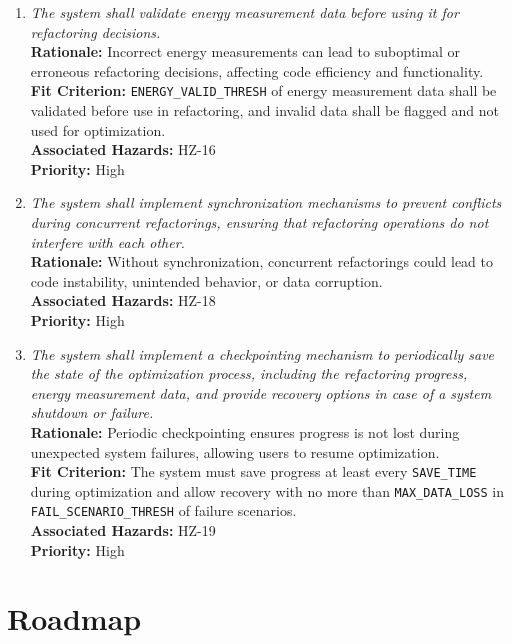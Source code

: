\documentclass{article}
\begin{document}
\begin{enumerate}[label=SCR \arabic*., wide=0pt, leftmargin=*]
    \item \emph{The system shall validate energy measurement data before using it for refactoring decisions.}\\
    {\bf Rationale:} Incorrect energy measurements can lead to suboptimal or erroneous refactoring decisions, affecting code efficiency and functionality.\\
    {\bf Fit Criterion:} \texttt{ENERGY\_VALID\_THRESH} of energy measurement data shall be validated before use in refactoring, and invalid data shall be flagged and not used for optimization.\\
    {\bf Associated Hazards:} HZ-16\\
    {\bf Priority:} High

    \item \emph{The system shall implement synchronization mechanisms to prevent conflicts during concurrent refactorings, ensuring that refactoring operations do not interfere with each other.}\\
    {\bf Rationale:} Without synchronization, concurrent refactorings could lead to code instability, unintended behavior, or data corruption.\\
    {\bf Associated Hazards:} HZ-18\\
    {\bf Priority:} High

    \item \emph{The system shall implement a checkpointing mechanism to periodically save the state of the optimization process, including the refactoring progress, energy measurement data, and provide recovery options in case of a system shutdown or failure.}\\
    {\bf Rationale:} Periodic checkpointing ensures progress is not lost during unexpected system failures, allowing users to resume optimization.\\
    {\bf Fit Criterion:} The system must save progress at least every \texttt{SAVE\_TIME} during optimization and allow recovery with no more than \texttt{MAX\_DATA\_LOSS} in \texttt{FAIL\_SCENARIO\_THRESH} of failure scenarios.\\
    {\bf Associated Hazards:} HZ-19\\
    {\bf Priority:} High

\end{enumerate}

\section{Roadmap}
\end{document}

